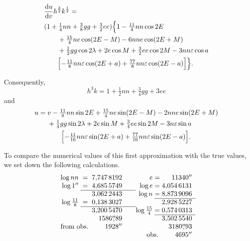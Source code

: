\[
\begin{aligned}
 &\frac{\mathrm{d}u}{\mathrm{d}v}h^{\frac32}k^{\frac12}=\\
 &(1+\tfrac14nn+\tfrac38gg+\tfrac32ee)
       \Bigl\{1-\tfrac{11}{4}nn\cos2E\\
 &\qquad+\tfrac{15}{4}ne\cos(2E-M)-6nne\cos(2E+M)\\
 &\qquad+\tfrac12gg\cos2\lambda+2e\cos M
                         +\tfrac32ee\cos2M-3nn\varepsilon\cos a\\
 &\qquad\Bigl[-\tfrac{11}{8}nn\varepsilon\cos(2E+a)
                         +\tfrac{77}{8}nn\varepsilon\cos(2E-a)\Bigr]\Bigr\}.
\end{aligned}
\]
\par\noindent\hspace*{\parindent}Consequently,
\[
 h^3k=1+\tfrac12nn+\tfrac34gg+3ee
\]
\noindent and
\[
\begin{aligned}
 u={}&v-\tfrac{11}{8}nn\sin2E+\tfrac{15}{4}ne\sin(2E-M)-2nne\sin(2E+M)\\
 &+\tfrac14gg\sin2\lambda+2e\sin M+\tfrac34ee\sin2M-3n\varepsilon\sin a\\
 &\qquad\Bigl[-\tfrac{11}{16}nn\varepsilon\sin(2E+a)
                    +\tfrac{77}{16}nn\varepsilon\sin(2E-a)\Bigr].
\end{aligned}
\]
\par\noindent\hspace*{\parindent}To compare the numerical values of this first
approximation with the true values, we set down the following
calculations.
\[
\begin{array}{r@{\;}c@{\;}r@{\qquad}r@{\;}c@{\;}r}
 \log nn&=&7{,}747\,8192 &e&=&11340^{\prime\prime}\\
 \log1^{\prime\prime}&=&4{,}685\,5749 &\log e&=&4{,}054\,6131\\ \cline{2-3}
 &&3{,}062\,2443 &\log n&=&8{,}873\,9096\\ \cline{5-6}
 \log\frac{11}{8}&=&0{,}138\,3027 &&&2{,}928\,5227\\ \cline{2-3}
 &&3{,}200\,5470 &\log\frac{15}{4}&=&0{,}574\,0313\\ \cline{5-6}
 &&1586\overset{\prime\prime}{,}89 &&&3{,}502\,5540\\
 \multicolumn{2}{r}{\text{from obs.}}&1928^{\prime\prime}
                  &&&3180\overset{\prime\prime}{,}93\\
 &&&\multicolumn{2}{r}{\text{obs.}}&4695^{\prime\prime}
\end{array}
\]
